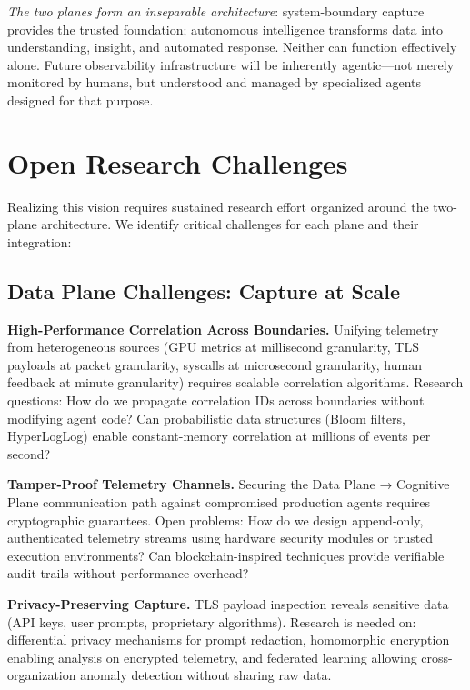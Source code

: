 \documentclass[sigplan,screen,9pt]{acmart}
\begin{document}
\emph{The two planes form an inseparable architecture}: system-boundary capture provides the trusted foundation; autonomous intelligence transforms data into understanding, insight, and automated response. Neither can function effectively alone. Future observability infrastructure will be inherently agentic—not merely monitored by humans, but understood and managed by specialized agents designed for that purpose.

\section{Open Research Challenges}

Realizing this vision requires sustained research effort organized around the two-plane architecture. We identify critical challenges for each plane and their integration:

\subsection{Data Plane Challenges: Capture at Scale}

\textbf{High-Performance Correlation Across Boundaries.} Unifying telemetry from heterogeneous sources (GPU metrics at millisecond granularity, TLS payloads at packet granularity, syscalls at microsecond granularity, human feedback at minute granularity) requires scalable correlation algorithms. Research questions: How do we propagate correlation IDs across boundaries without modifying agent code? Can probabilistic data structures (Bloom filters, HyperLogLog) enable constant-memory correlation at millions of events per second?

\textbf{Tamper-Proof Telemetry Channels.} Securing the Data Plane → Cognitive Plane communication path against compromised production agents requires cryptographic guarantees. Open problems: How do we design append-only, authenticated telemetry streams using hardware security modules or trusted execution environments? Can blockchain-inspired techniques provide verifiable audit trails without performance overhead?

\textbf{Privacy-Preserving Capture.} TLS payload inspection reveals sensitive data (API keys, user prompts, proprietary algorithms). Research is needed on: differential privacy mechanisms for prompt redaction, homomorphic encryption enabling analysis on encrypted telemetry, and federated learning allowing cross-organization anomaly detection without sharing raw data.
\end{document}
